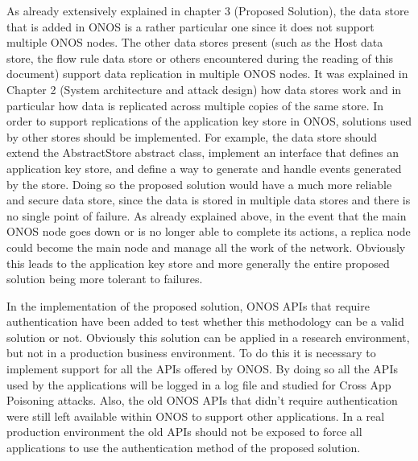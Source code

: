 \documentclass[a4paper,10pt]{memoir}
\begin{document}
{As already extensively explained in chapter 3 (Proposed Solution), the data store that is added in ONOS is a rather particular one since it does not support multiple ONOS nodes. The other data stores present (such as the Host data store, the flow rule data store or others encountered during the reading of this document) support data replication in multiple ONOS nodes. It was explained in Chapter 2 (System architecture and attack design) how data stores work and in particular how data is replicated across multiple copies of the same store. In order to support replications of the application key store in ONOS, solutions used by other stores should be implemented. For example, the data store should extend the AbstractStore abstract class, implement an interface that defines an application key store, and define a way to generate and handle events generated by the store. Doing so the proposed solution would have a much more reliable and secure data store, since the data is stored in multiple data stores and there is no single point of failure. As already explained above, in the event that the main ONOS node goes down or is no longer able to complete its actions, a replica node could become the main node and manage all the work of the network. Obviously this leads to the application key store and more generally the entire proposed solution being more tolerant to failures.
\medskip

In the implementation of the proposed solution, ONOS APIs that require authentication have been added to test whether this methodology can be a valid solution or not. Obviously this solution can be applied in a research environment, but not in a production business environment. To do this it is necessary to implement support for all the APIs offered by ONOS. By doing so all the APIs used by the applications will be logged in a log file and studied for Cross App Poisoning attacks. Also, the old ONOS APIs that didn't require authentication were still left available within ONOS to support other applications. In a real production environment the old APIs should not be exposed to force all applications to use the authentication method of the proposed solution.
\medskip 

}
\end{document}
